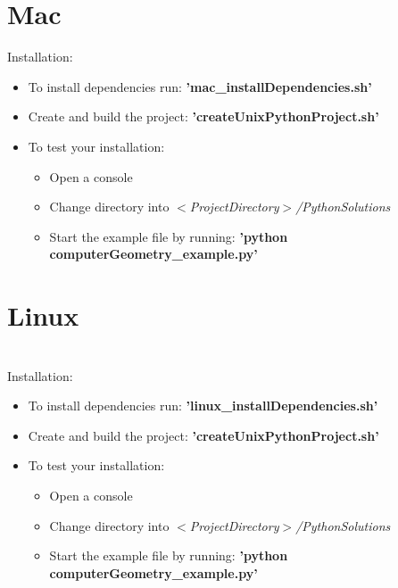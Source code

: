 \documentclass[]{article}
\begin{document}
\newpage
\section{Mac}\label{Mac}

Installation:
\begin{itemize}
	\item To install dependencies run: \textbf{'mac\_installDependencies.sh'}
	\item Create and build the project: \textbf{'createUnixPythonProject.sh'}
	\item To test your installation:
	\begin{itemize}
		\item Open a console
		\item Change directory into \textit{$<$ProjectDirectory$>$/PythonSolutions}
		\item Start the example file by running: \textbf{'python computerGeometry\_example.py'}
	\end{itemize}
\end{itemize}

\newpage
\section{Linux}\label{Linux}

\mbox{}\\
Installation:
\begin{itemize}
	\item To install dependencies run: \textbf{'linux\_installDependencies.sh'}
	\item Create and build the project: \textbf{'createUnixPythonProject.sh'}
	\item To test your installation:
	\begin{itemize}
		\item Open a console
		\item Change directory into \textit{$<$ProjectDirectory$>$/PythonSolutions}
		\item Start the example file by running: \textbf{'python computerGeometry\_example.py'}
	\end{itemize}
\end{itemize}
\end{document}
